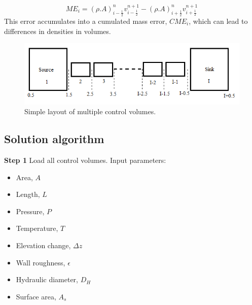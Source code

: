 \documentclass[11pt,letterpaper,titlepage]{article}
\newcommand{\half}{\frac{1}{2}}
\begin{document}
\begin{equation*}
ME_i = (\rho.A)_{i-\half}^{n}v_{i-\half}^{n+1}-(\rho.A)_{i+\half}^{n} v_{i+\half}^{n+1}
\end{equation*}
\newline
This error accumulates into a cumulated mass error, $CME_i$, which can lead to differences in densities in volumes.


	\begin{center}
		\begin{minipage}[c]{0.85\textwidth}
	
			\begin{figure}[H]
			
				\includegraphics[width=6in]{ZZZ_SimpleSystem.png}
				\caption{Simple layout of multiple control volumes.}
				\label{figure:ZZZ_SimpleSystem}
			\end{figure}
		\end{minipage}
	\end{center}
\vspace{0.5cm}










\newpage
\subsection{Solution algorithm}

\textbf{Step 1}\newline
Load all control volumes. Input parameters:
\begin{itemize}
\item Area, $A$
\item Length, $L$
\item Pressure, $P$
\item Temperature, $T$
\item Elevation change, $\Delta z$
\item Wall roughness, $\epsilon$
\item Hydraulic diameter, $D_H$
\item Surface area, $A_s$
\end{itemize}
\end{document}
